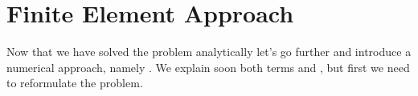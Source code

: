 \chapter{Finite Element Approach} \label{cha:FEM_Approach}
Now that we have solved the problem analytically let's go further and introduce a numerical approach, namely .
We explain soon both terms  and , but first we need to reformulate the problem.







